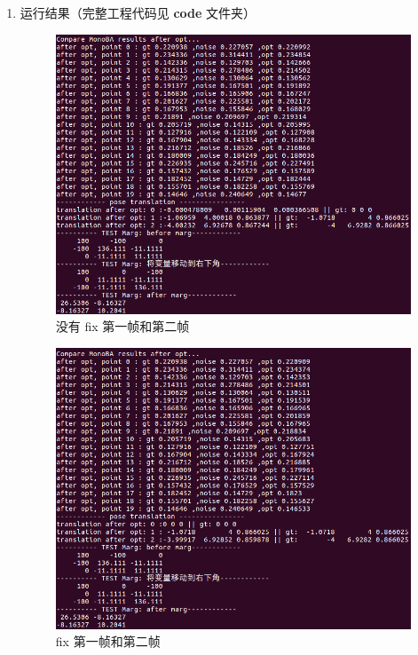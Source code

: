 \documentclass[12pt,a4paper]{article}
\begin{document}
\begin{enumerate}
\item 运行结果（完整工程代码见 \textbf{code} 文件夹）

\begin{figure}[htbp] 
	\centering
	\includegraphics[width=15cm]{ba_mono_01.png}
	\caption{没有 fix 第一帧和第二帧}
\end{figure} 

\begin{figure}[htbp] 
	\centering
	\includegraphics[width=15cm]{ba_mono_02.png}
	\caption{fix 第一帧和第二帧}
\end{figure} 

\end{enumerate}
\end{document}
